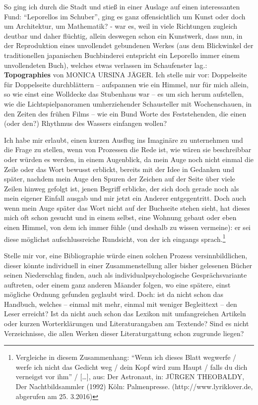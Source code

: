 \documentclass[a4paper,
fontsize=11pt,
oneside,
numbers=noperiodatend,
parskip=half-,
bibliography=totoc,
final
]{scrartcl}
\begin{document}
So ging ich durch die Stadt und stieß in einer Auslage auf einen
interessanten Fund: \enquote{Leporellos im Schuber}, ging es ganz
offensichtlich um Kunst oder doch um Architektur, um Mathematik? - war
es, weil in viele Richtungen zugleich deutbar und daher flüchtig, allein
deswegen schon ein Kunstwerk, dass nun, in der Reproduktion eines
unvollendet gebundenen Werkes (aus dem Blickwinkel der traditionellen
japanischen Buchbinderei entspricht ein Leporello immer einem
unvollendeten Buch), welches etwas verlassen im Schaufenster lag.:
\textbf{Topographies} von MONICA URSINA JÄGER. Ich stelle mir vor:
Doppelseite für Doppelseite durchblättern -- aufspannen wie ein Himmel,
nur für mich allein, so wie einst eine Wolldecke das Stubenhaus war --
es um sich herum aufstellen, wie die Lichtspielpanoramen umherziehender
Schausteller mit Wochenschauen, in den Zeiten des frühen Films -- wie
ein Bund Worte des Feststehenden, die einen (oder den?) Rhythmus des
Wassers einfangen wollen?

Ich habe mir erlaubt, einen kurzen Ausflug ins Imaginäre zu unternehmen
und die Frage zu stellen, wenn von Prozessen die Rede ist, wie wären sie
beschreibbar oder würden es werden, in einem Augenblick, da mein Auge
noch nicht einmal die Zeile oder das Wort bewusst erblickt, bereits mit
der Idee in Gedanken und später, nachdem mein Auge den Spuren der
Zeichen auf der Seite über viele Zeilen hinweg gefolgt ist, jenen
Begriff erblicke, der sich doch gerade noch als mein eigener Einfall
ausgab und mir jetzt ein Anderer entgegentritt. Doch auch wenn mein Auge
später das Wort nicht auf der Buchseite stehen sieht, hat dieses mich
oft schon gesucht und in einem selbst, eine Wohnung gebaut oder eben
einen Himmel, von dem ich immer fühle (und deshalb zu wissen vermeine):
er sei diese möglichst aufschlussreiche Rundsicht, von der ich eingangs
sprach.\footnote{Vergleiche in diesem Zusammenhang: \enquote{Wenn ich
  dieses Blatt wegwerfe / werfe ich nicht das Gedicht weg / dein Kopf
  wird zum Haupt / falls du dich verneigst vor ihm} / {[}\ldots{}{]},
  aus: Der Astronaut, in: JÜRGEN THEOBALDY, Der Nachtbildsammler (1992)
  Köln: Palmenpresse. (http://www.lyriklover.de, abgerufen am 25.
  3.2016)}

Stelle mir vor, eine Bibliographie würde einen solchen Prozess
versinnbildlichen, dieser könnte individuell in einer Zusammenstellung
aller bisher gelesenen Bücher seinen Niederschlag finden, auch als
individualpsychologische Gesprächsvariante auftreten, oder einem ganz
anderen Mäander folgen, wo eine spätere, einst mögliche Ordnung gefunden
geglaubt wird. Doch: ist da nicht schon das Handbuch, welches -- einmal
mit mehr, einmal mit weniger Begleittext -- den Leser erreicht? Ist da
nicht auch schon das Lexikon mit umfangreichen Artikeln oder kurzen
Worterklärungen und Literaturangaben am Textende? Sind es nicht
Verzeichnisse, die allen Werken dieser Literaturgattung schon zugrunde
liegen?
\end{document}
